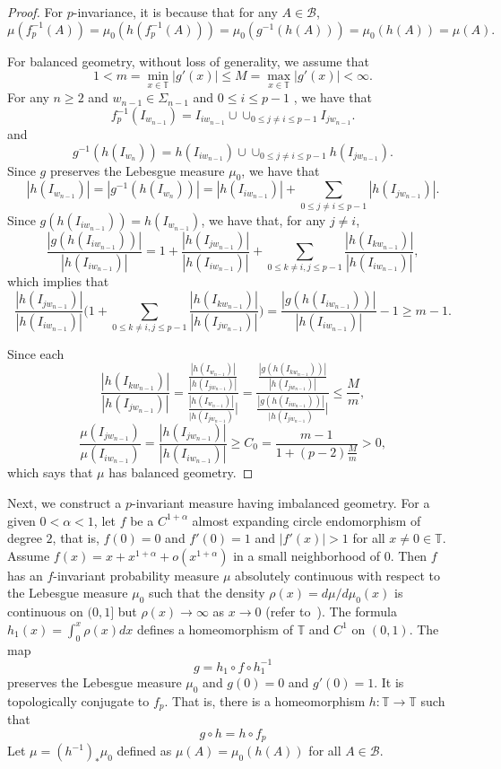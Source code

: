 \documentclass[11pt]{amsart}
\theoremstyle{definition}
\def\m{\mu}
\def\T{\mathbb{T}}
\def\S{\Sigma}
\def\B{\mathcal{B}}
\begin{document}
\begin{proof}
For $p$-invariance, it is because that for any $A\in \B$, 
$$
\m(f_{p}^{-1}(A)) =\m_{0} (h(f_{p}^{-1}(A))) =\m_{0} (g^{-1} (h(A))) = \m_{0} (h(A))=\m (A).
$$
 
For balanced geometry, without loss of generality, we assume that
$$
1< m =\min_{x\in \T} |g'(x)| \leq M=\max_{x\in \T} |g'(x)| <\infty.
$$ 
For any $n\geq 2$ and $w_{n-1}\in \S_{n-1}$ and $0\leq i\leq p-1$ , we have that 
$$
f_{p}^{-1} (I_{w_{n-1}}) = I_{iw_{n-1}} \cup \cup_{0\leq j\not=i\leq p-1} I_{jw_{n-1}}.
$$
and 
$$
g^{-1} (h(I_{w_{n}})) =h(I_{iw_{n-1}}) \cup \cup_{0\leq j\not=i\leq p-1} h(I_{jw_{n-1}}).
$$
Since $g$ preserves the Lebesgue measure $\m_{0}$, we have that
$$
|h(I_{w_{n-1}})| =|g^{-1} (h(I_{w_{n}}))| = |h(I_{iw_{n-1}})| + \sum_{0\leq j\not=i\leq p-1} |h(I_{jw_{n-1}})|.
$$
Since $g(h(I_{iw_{n-1}})) = h(I_{w_{n-1}})$, we have that, for any $j\not=i$,
$$
\frac{|g(h(I_{iw_{n-1}}))|}{|h(I_{iw_{n-1}})|} =1+ \frac{|h(I_{jw_{n-1}})|}{|h(I_{iw_{n-1}})|} +\sum_{0\leq k\not=i, j\leq p-1} 
\frac{|h(I_{kw_{n-1}})|}{|h(I_{iw_{n-1}})|},
$$
which implies that
$$
 \frac{|h(I_{jw_{n-1}})|}{|h(I_{iw_{n-1}})|} \Big( 1+\sum_{0\leq k\not=i, j\leq p-1} 
\frac{|h(I_{kw_{n-1}})|}{|h(I_{jw_{n-1}})|} \Big) 
= \frac{|g(h(I_{iw_{n-1}}))|}{|h(I_{iw_{n-1}})|} -1 \geq m -1.
$$

Since each 
$$
\frac{|h(I_{kw_{n-1}})|}{|h(I_{jw_{n-1}})|}
=
\frac{\frac{|h(I_{w_{n-1}})|}{|h(I_{jw_{n-1}})|}}
{\frac{|h(I_{w_{n-1}})|}{|h(I_{jw_{n-1}})}|}
=
\frac{\frac{|g(h(I_{kw_{n-1}}))|}{|h(I_{jw_{n-1}})|}}
{\frac{|g(h(I_{iw_{n-1}}))|}{|h(I_{jw_{n-1}})}|} \leq \frac{M}{m},
$$
$$
 \frac{\mu (I_{jw_{n-1}})}{\mu (I_{iw_{n-1}})} = \frac{|h(I_{jw_{n-1}})|}{|h(I_{iw_{n-1}})|} \geq C_{0}=\frac{m-1}{1+(p-2)\frac{M}{m}}>0,
 $$
which says that $\m$ has balanced geometry. 

\end{proof}

Next, we construct a $p$-invariant measure having imbalanced geometry. 
For a given $0<\alpha<1$, let $f$ be a $C^{1+\alpha}$ almost expanding circle endomorphism of degree $2$, that is, $f(0)=0$ and $f'(0)=1$ and $|f'(x)|>1$ for all $x\not= 0\in \T$. Assume $f(x) =x +x^{1+\alpha} +o(x^{1+\alpha})$ in a small neighborhood of $0$. Then $f$ has an $f$-invariant probability measure $\m$ absolutely continuous with respect to the Lebesgue measure $\m_{0}$ such that the density $\rho (x) =d\m/d\m_{0} (x)$ is continuous on $(0,1]$ but $\rho (x) \to \infty$ as $x \to 0$ (refer to~\cite{Hu}). 
The formula $h_{1}(x)=\int_{0}^{x} \rho(x) dx$ defines a homeomorphism of $\T$ and $C^{1}$ on $(0,1)$. The map 
$$
g= h_{1} \circ f\circ h_{1}^{-1}
$$
preserves the Lebesgue measure $\m_{0}$ and $g(0)=0$ and $g'(0)=1$. It is topologically conjugate to $f_{p}$. That is, there is a homeomorphism $h: \T\to \T$ such that
$$
g\circ h= h\circ f_{p}
$$
Let $\m=(h^{-1})_{*} \m_{0}$ defined as $\m(A) =\m_{0} (h(A))$ for all $A\in \B$.
\end{document}
